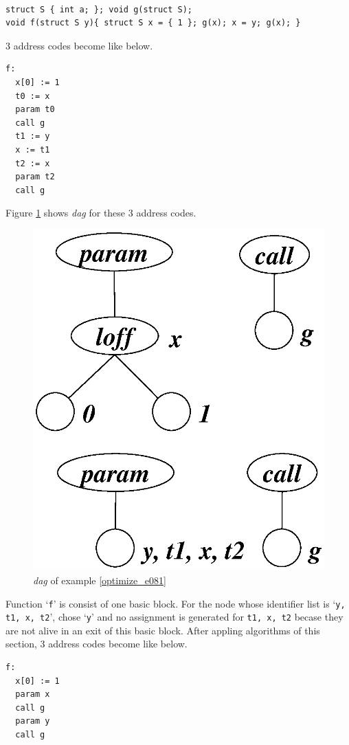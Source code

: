\begin{Example}
\label{optimize_e081}
\begin{verbatim}

struct S { int a; }; void g(struct S);
void f(struct S y){ struct S x = { 1 }; g(x); x = y; g(x); }
\end{verbatim}
3 address codes become like below.
\begin{verbatim}
f:
  x[0] := 1
  t0 := x
  param t0
  call g
  t1 := y
  x := t1
  t2 := x
  param t2
  call g
\end{verbatim}
Figure \ref{optimize_e082} shows {\em dag} for these 3 address codes.
\begin{figure}[htbp]
\begin{center}
\includegraphics[width=0.493\linewidth,height=0.6\linewidth]{opt034.eps}
\caption{{\em dag} of example \ref{optimize_e081}}
\label{optimize_e082}
\end{center}
\end{figure}
Function `{\tt{f}}' is consist of one basic block.
For the node whose identifier list is `{\tt{y, t1, x, t2}}',
chose `{\tt{y}}' and no assignment is generated for
{\tt{t1, x, t2}} becase they are not alive in an exit
of this basic block.
After appling algorithms of this section,
3 address codes become like below.
\begin{verbatim}
f:
  x[0] := 1
  param x
  call g
  param y
  call g
\end{verbatim}
\end{Example}

